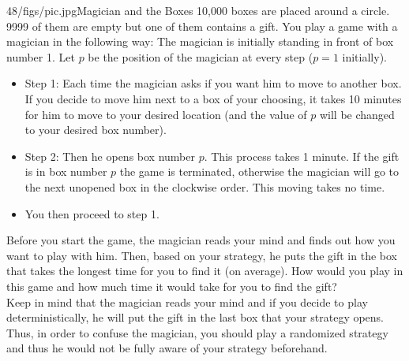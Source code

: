 \begin{problem}{48/figs/pic.jpg}{Magician and the Boxes} 10,000 boxes are placed around a circle. 9999 of them are empty but one of them contains a gift. You play a game with a magician in the following way: 	The magician is initially standing in front of box number 1. Let $p$ be the position of the magician at every step ($p=1$ initially).
	\begin{itemize}
	\item \textsf{Step 1}: Each time the magician asks if you want him to move to another box. If you decide to move him next to a box of your choosing, it takes 10 minutes for him to move to your desired location (and the value of $p$ will be changed to your desired box number).
	\item \textsf{Step 2}: Then he opens box number $p$. This process takes 1 minute. If the gift is in box number $p$ the game is terminated, otherwise the magician will go to the next unopened box in the clockwise order. This moving takes no time.
	\item You then proceed to step 1.
	\end{itemize}

Before you start the game, the magician reads your mind and finds out how you want to play with him. Then, based on your strategy, he puts the gift in the box that takes the longest time for you to find it (on average). How would you play in this game and how much time it would take for you to find the gift?\\[0.2cm]

Keep in mind that the magician reads your mind and if you decide to play deterministically, he will put the gift in the last box that your strategy opens. Thus, in order to confuse the magician, you should play a randomized strategy and thus he would not be fully aware of your strategy beforehand.

\end{problem}
